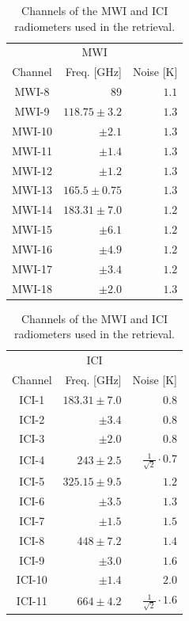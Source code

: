\documentclass[journal abbreviation, manuscript]{copernicus}
\begin{document}
\begin{table}[hbpt]
\caption{Channels of the MWI and ICI radiometers used in the retrieval.}
\label{tab:channels}
    \begin{tabular}{c|r|r}
    \multicolumn{3}{c}{MWI}\\
    Channel & Freq. [GHz] & Noise [K]\\
    \hline
    MWI-8  & $89$              & $1.1$ \\
    MWI-9  & $118.75 \pm 3.2$  & $1.3$ \\
    MWI-10 & $\pm 2.1$         & $1.3$ \\
    MWI-11 & $\pm 1.4$         & $1.3$ \\
    MWI-12 & $\pm 1.2$         & $1.3$ \\
    MWI-13 & $165.5 \pm 0.75$  & $1.3$ \\
    MWI-14 & $183.31 \pm 7.0$  & $1.2$ \\
    MWI-15 & $ \pm 6.1$        & $1.2$ \\
    MWI-16 & $ \pm 4.9$        & $1.2$ \\
    MWI-17 & $ \pm 3.4$        & $1.2$ \\
    MWI-18 & $ \pm 2.0$        & $1.3$ \\
    \end{tabular}%
    \hspace{1cm}%
    \begin{tabular}{c|r|r}
    \multicolumn{3}{c}{ICI}\\
    Channel & Freq. [GHz] & Noise [K] \\
    \hline
    ICI-1  & $183.31 \pm 7.0$ & $0.8$\\
    ICI-2  & $       \pm 3.4$ & $0.8$\\
    ICI-3  & $       \pm 2.0$ & $0.8$\\
    ICI-4  & $243    \pm 2.5$ & $\frac{1}{\sqrt{2}} \cdot 0.7$\\
    ICI-5  & $325.15 \pm 9.5$ & $1.2$\\
    ICI-6  & $       \pm 3.5$ & $1.3$\\
    ICI-7  & $       \pm 1.5$ & $1.5$\\
    ICI-8  & $448    \pm 7.2$ & $1.4$\\
    ICI-9  & $       \pm 3.0$ & $1.6$\\
    ICI-10 & $       \pm 1.4$ & $2.0$\\
    ICI-11 & $664    \pm 4.2$ & $\frac{1}{\sqrt{2}} \cdot 1.6$\\
    \end{tabular}
\end{table}
\end{document}
